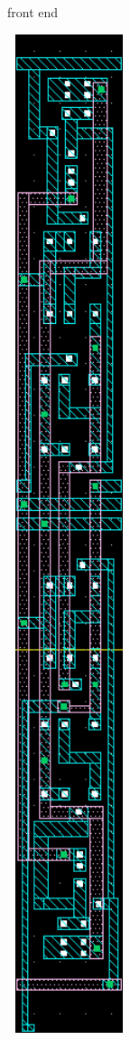 \documentclass[11pt,a4paper,oneside,dutch]{article}
\begin{document}
\begin{figure}[htp]
\begin{subfigure}[b]{0.25\textwidth}
		\caption{front end}
	\end{subfigure}
	\quad
	\begin{subfigure}[b]{0.25\textwidth}
		\centering
		\includegraphics[width=0.4\textwidth]{elementary_backend.png}

\end{subfigure}
\end{figure}
\end{document}
